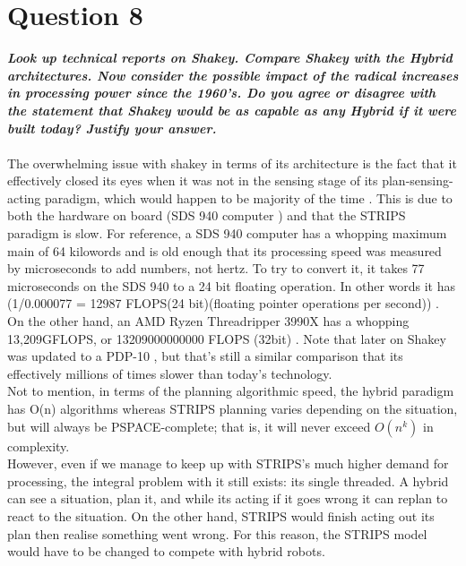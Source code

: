 \documentclass{article}
\newcommand\tab[1][1cm]{\hspace*{#1}}
\begin{document}
\section*{Question 8}
\textbf{\textit{
    \tab Look up technical reports on Shakey. Compare Shakey with the Hybrid
architectures.  Now  consider  the  possible  impact  of the  radical  increases  in
 processing power since the 1960’s. Do you agree or disagree with the statement that
Shakey would be as capable as any Hybrid if it were built today? Justify your answer.
}} \\ \\
The overwhelming issue with shakey in terms of its architecture is the fact that it effectively closed its eyes when it was not in
the sensing stage of its plan-sensing-acting paradigm, which would happen to be majority of the time \cite{IntroToAI}. This is due 
to both the hardware on board (SDS 940 computer \cite{shakey}) and that the STRIPS paradigm is slow. For reference, a SDS 940 computer
has a whopping maximum main of 64 kilowords and is old enough that its processing speed was 
measured by microseconds to add numbers, not hertz. 
To try to convert it, it takes 77 microseconds on the SDS 940 to a 24 bit floating operation. 
In other words it has (1/0.000077 = 12987 FLOPS(24 bit)(floating pointer operations per second)) \cite{SDS940}. 
On the other hand, an AMD Ryzen Threadripper 3990X has a whopping 13,209GFLOPS, or 13209000000000 FLOPS (32bit) \cite{threadripper}.
Note that later on Shakey was updated to a PDP-10 \cite{shakey}, but that's still a similar comparison
that its effectively millions of times slower than today's technology. 
\\
\tab Not to mention, in terms of the planning algorithmic speed, the hybrid paradigm has O(n) algorithms \cite{IntroToAI} 
whereas STRIPS planning varies depending on the situation, but will always be 
PSPACE-complete; that is, it will never exceed $O(n^k)$ in complexity. 
\\
\tab However, even if we manage to keep up with STRIPS's much higher demand for processing, the integral problem with 
it still exists: its single threaded. A hybrid can see a situation, plan it, and while its acting if it goes wrong 
it can replan to react to the situation. On the other hand, STRIPS would finish acting out its plan then realise something
went wrong. For this reason, the STRIPS model would have to be changed to compete with hybrid robots.
\newpage



\end{document}
